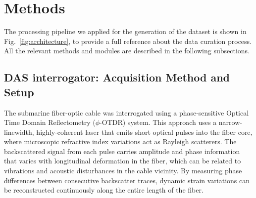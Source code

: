 \documentclass[11pt]{article}
\begin{document}
\section{Methods}
\label{sec:methods}

The processing pipeline we applied for the generation of the dataset is shown in Fig.~\ref{fig:architecture}, to provide a full reference about the data curation process. All the relevant methods and modules are described in the following subsections.


\subsection{DAS interrogator: Acquisition Method and Setup}
\label{sec:acquisition-method}

The submarine fiber-optic cable was interrogated using a phase-sensitive Optical Time Domain Reflectometry ($\phi$-OTDR) system. This approach uses a narrow-linewidth, highly-coherent laser that emits short optical pulses into the fiber core, where microscopic refractive index variations act as Rayleigh scatterers. The backscattered signal from each pulse carries amplitude and phase information that varies with longitudinal deformation in the fiber, which can be related to vibrations and acoustic disturbances in the cable vicinity. By measuring phase differences between consecutive backscatter traces, dynamic strain variations can be reconstructed continuously along the entire length of the fiber.
\end{document}
